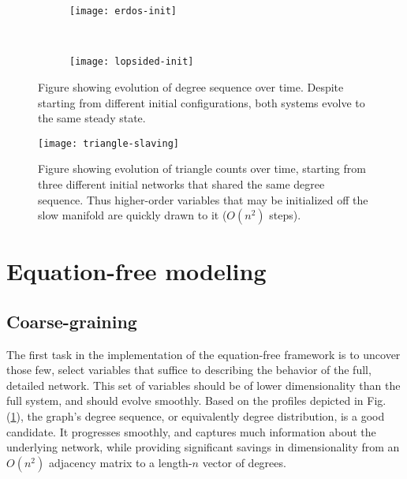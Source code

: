 \documentclass[12pt]{article}
\begin{document}
\begin{onehalfspace}
\begin{figure}[h!]
  \vspace{-5mm}
  \centering
  \begin{subfigure}{0.75\textwidth}
    \centering
    \texttt{[image: erdos-init]}
  \end{subfigure} \\ %
  \begin{subfigure}{0.75\textwidth}
    \centering
    \texttt{[image: lopsided-init]}
  \end{subfigure}%
  \caption{Figure showing evolution of degree sequence over time. Despite starting from different initial configurations, both systems evolve to the same steady state. \label{fig:dse}}
\end{figure}


\begin{figure}[ht!]
  \centering
  \texttt{[image: triangle-slaving]}
  \caption{Figure showing evolution of triangle counts over time,
    starting from three different initial networks that shared the
    same degree sequence. Thus higher-order variables that may be
    initialized off the slow manifold are quickly drawn to it
    ($O(n^2)$ steps). \label{fig:sv}}
\end{figure}

\section{Equation-free modeling}
\label{sec:ef}

\subsection{Coarse-graining}

The first task in the implementation of the equation-free framework is to uncover those few, select variables that suffice to describing the behavior of the full, detailed network. This set of variables should be of lower dimensionality than the full system, and should evolve smoothly. Based on the profiles depicted in Fig. (\ref{fig:dse}), the graph's degree sequence, or equivalently degree distribution, is a good candidate. It progresses smoothly, and captures much information about the underlying network, while providing significant savings in dimensionality from an $O(n^2)$ adjacency matrix to a length-$n$ vector of degrees. \par


\end{onehalfspace}
\end{document}

